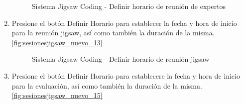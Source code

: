 \begin{enumerate}
	\begin{figure}[h!]
		\centering
		\caption{Sistema Jigsaw Coding - Definir horario de reunión de expertos}
		\label{fig:sesionesjigsaw_nuevo_11}
	\end{figure}
	\item Presione el botón Definir Horario para establecer la fecha y hora de inicio para la reunión jigsaw, así como también la duración de la misma. \autoref{fig:sesionesjigsaw_nuevo_13}
	\begin{figure}[h!]
		\centering
		\caption{Sistema Jigsaw Coding - Definir horario de reunión jigsaw}
		\label{fig:sesionesjigsaw_nuevo_13}
	\end{figure}
	\item Presione el botón Definir Horario para establecere la fecha y hora de inicio para la evaluación, así como también la duración de la misma. \autoref{fig:sesionesjigsaw_nuevo_15}
	\begin{figure}[h!]

\end{figure}
\end{enumerate}

